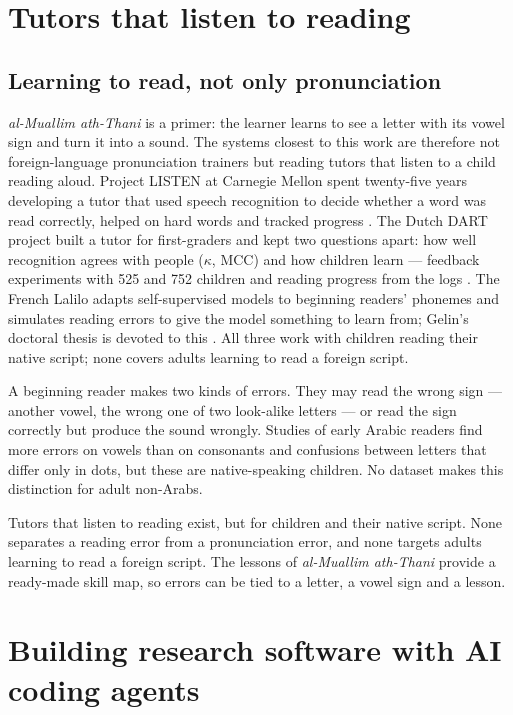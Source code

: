 \documentclass[a4paper,14pt]{extarticle}
\begin{document}
\section{Tutors that listen to reading}

\subsection{Learning to read, not only pronunciation}

\emph{al-Muallim ath-Thani} is a primer: the learner learns to see a letter with its vowel sign and turn it into
a sound. The systems closest to this work are therefore not foreign-language pronunciation trainers but
reading tutors that listen to a child reading aloud. Project LISTEN at Carnegie Mellon spent twenty-five years
developing a tutor that used speech recognition to decide whether a word was read correctly, helped on hard
words and tracked progress \cite{SRC-125}. The Dutch DART project built a tutor for first-graders and kept two
questions apart: how well recognition agrees with people ($\kappa$, MCC) and how children learn --- feedback
experiments with 525 and 752 children and reading progress from the logs \cite{SRC-130,SRC-131}. The French
Lalilo adapts self-supervised models to beginning readers' phonemes and simulates reading errors to give the
model something to learn from; Gelin's doctoral thesis is devoted to this \cite{SRC-132,SRC-133}. All three
work with children reading their native script; none covers adults learning to read a foreign script.

A beginning reader makes two kinds of errors. They may read the wrong sign --- another vowel, the wrong one of
two look-alike letters --- or read the sign correctly but produce the sound wrongly. Studies of early Arabic
readers find more errors on vowels than on consonants and confusions between letters that differ only in
dots, but these are native-speaking children. No dataset makes this distinction for adult non-Arabs.

\begin{keybox}[Implication]
Tutors that listen to reading exist, but for children and their native script. None separates a reading error
from a pronunciation error, and none targets adults learning to read a foreign script. The lessons of
\emph{al-Muallim ath-Thani} provide a ready-made skill map, so errors can be tied to a letter, a vowel sign and a
lesson.
\end{keybox}

\section{Building research software with AI coding agents}
\end{document}
